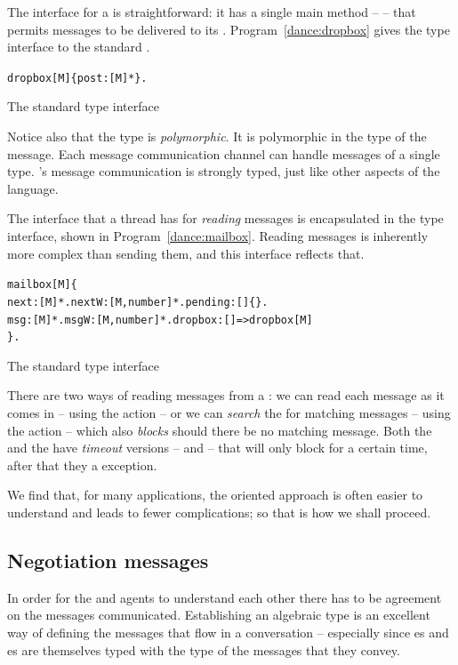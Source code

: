 The interface for a  is straightforward: it has a single main method --  -- that permits messages to be delivered to its . Program~\vref{dance:dropbox} gives the type interface to the standard .
\begin{program}
\vspace{0.5ex}
\begin{alltt}
dropbox[M] \impl \{ post:[M]* \}.
\end{alltt}
\vspace{-2ex}
\caption{The standard  type interface}
\label{dance:dropbox}
\end{program}
Notice also that the  type is \emph{polymorphic}. It is polymorphic in the type of the message. Each message communication channel can handle messages of a single type. \go's message communication is strongly typed, just like other aspects of the language.

The interface that a thread has for \emph{reading} messages is encapsulated in the  type interface, shown in Program~\vref{dance:mailbox}. Reading messages is inherently more complex than sending them, and this interface reflects that.
\begin{program}
\vspace{0.5ex}
\begin{alltt}
mailbox[M] \impl \{
  next:[M]*. nextW:[M,number]*. pending:[]\{\}.
  msg:[M]*. msgW:[M,number]*. dropbox:[]=>dropbox[M]
\}.
\end{alltt}
\vspace{-2ex}
\caption{The standard  type interface}
\label{dance:mailbox}
\end{program}

There are two ways of reading messages from a : we can read each message as it comes in -- using the  action -- or we can \emph{search} the  for matching messages -- using the  action -- which also \emph{blocks} should there be no matching message. Both the  and the  have \emph{timeout} versions --  and  -- that will only block for a certain time, after that they  a  exception.

We find that, for many applications, the  oriented approach is often easier to understand and leads to fewer complications; so that is how we shall proceed.

\subsection{Negotiation messages}
\label{dance:message}
In order for the \mail and \phemail agents to understand each other there has to be agreement on the messages communicated. Establishing an algebraic type is an excellent way of defining the messages that flow in a conversation -- especially since es and es are themselves typed with the type of the messages that they convey.

